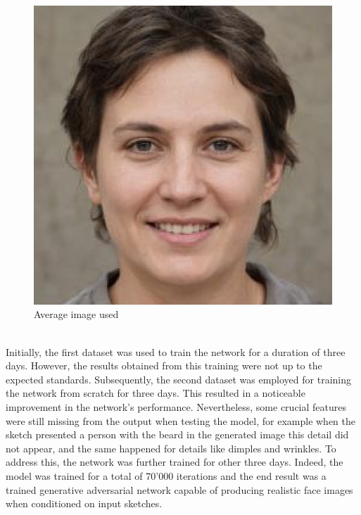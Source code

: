 \begin{figure}[htbp]
\centering
  \includegraphics[scale=0.2]{figures/avg_image.png}
  \caption{Average image used}
  \label{fig:Average image}
\end{figure}
\\
Initially, the first dataset was used to train the network for a duration of three days. However, the results obtained from this training were not up to the expected standards. Subsequently, the second dataset was employed for training the network from scratch for three days. This resulted in a noticeable improvement in the network's performance. Nevertheless, some crucial features were still missing from the output when testing the model, for example when the sketch presented a person with the beard in the generated image this detail did not appear, and the same happened for details like dimples and wrinkles. To address this, the network was further trained for other three days. Indeed, the model was trained for a total of 70'000 iterations and the end result was a trained generative adversarial network capable of producing realistic face images when conditioned on input sketches.\\
